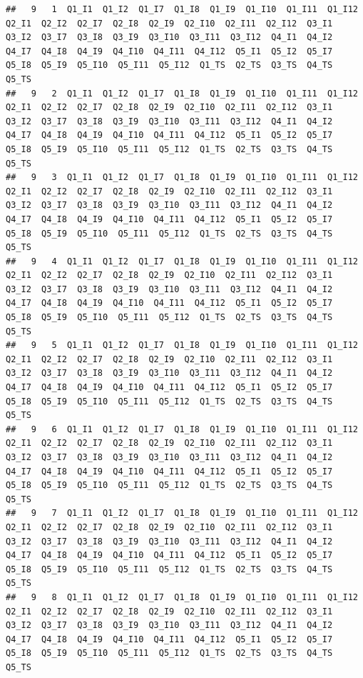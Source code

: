 \documentclass[]{book}
\begin{document}
\begin{verbatim}
##   9   1  Q1_I1  Q1_I2  Q1_I7  Q1_I8  Q1_I9  Q1_I10  Q1_I11  Q1_I12  Q2_I1  Q2_I2  Q2_I7  Q2_I8  Q2_I9  Q2_I10  Q2_I11  Q2_I12  Q3_I1  Q3_I2  Q3_I7  Q3_I8  Q3_I9  Q3_I10  Q3_I11  Q3_I12  Q4_I1  Q4_I2  Q4_I7  Q4_I8  Q4_I9  Q4_I10  Q4_I11  Q4_I12  Q5_I1  Q5_I2  Q5_I7  Q5_I8  Q5_I9  Q5_I10  Q5_I11  Q5_I12  Q1_TS  Q2_TS  Q3_TS  Q4_TS  Q5_TS
##   9   2  Q1_I1  Q1_I2  Q1_I7  Q1_I8  Q1_I9  Q1_I10  Q1_I11  Q1_I12  Q2_I1  Q2_I2  Q2_I7  Q2_I8  Q2_I9  Q2_I10  Q2_I11  Q2_I12  Q3_I1  Q3_I2  Q3_I7  Q3_I8  Q3_I9  Q3_I10  Q3_I11  Q3_I12  Q4_I1  Q4_I2  Q4_I7  Q4_I8  Q4_I9  Q4_I10  Q4_I11  Q4_I12  Q5_I1  Q5_I2  Q5_I7  Q5_I8  Q5_I9  Q5_I10  Q5_I11  Q5_I12  Q1_TS  Q2_TS  Q3_TS  Q4_TS  Q5_TS
##   9   3  Q1_I1  Q1_I2  Q1_I7  Q1_I8  Q1_I9  Q1_I10  Q1_I11  Q1_I12  Q2_I1  Q2_I2  Q2_I7  Q2_I8  Q2_I9  Q2_I10  Q2_I11  Q2_I12  Q3_I1  Q3_I2  Q3_I7  Q3_I8  Q3_I9  Q3_I10  Q3_I11  Q3_I12  Q4_I1  Q4_I2  Q4_I7  Q4_I8  Q4_I9  Q4_I10  Q4_I11  Q4_I12  Q5_I1  Q5_I2  Q5_I7  Q5_I8  Q5_I9  Q5_I10  Q5_I11  Q5_I12  Q1_TS  Q2_TS  Q3_TS  Q4_TS  Q5_TS
##   9   4  Q1_I1  Q1_I2  Q1_I7  Q1_I8  Q1_I9  Q1_I10  Q1_I11  Q1_I12  Q2_I1  Q2_I2  Q2_I7  Q2_I8  Q2_I9  Q2_I10  Q2_I11  Q2_I12  Q3_I1  Q3_I2  Q3_I7  Q3_I8  Q3_I9  Q3_I10  Q3_I11  Q3_I12  Q4_I1  Q4_I2  Q4_I7  Q4_I8  Q4_I9  Q4_I10  Q4_I11  Q4_I12  Q5_I1  Q5_I2  Q5_I7  Q5_I8  Q5_I9  Q5_I10  Q5_I11  Q5_I12  Q1_TS  Q2_TS  Q3_TS  Q4_TS  Q5_TS
##   9   5  Q1_I1  Q1_I2  Q1_I7  Q1_I8  Q1_I9  Q1_I10  Q1_I11  Q1_I12  Q2_I1  Q2_I2  Q2_I7  Q2_I8  Q2_I9  Q2_I10  Q2_I11  Q2_I12  Q3_I1  Q3_I2  Q3_I7  Q3_I8  Q3_I9  Q3_I10  Q3_I11  Q3_I12  Q4_I1  Q4_I2  Q4_I7  Q4_I8  Q4_I9  Q4_I10  Q4_I11  Q4_I12  Q5_I1  Q5_I2  Q5_I7  Q5_I8  Q5_I9  Q5_I10  Q5_I11  Q5_I12  Q1_TS  Q2_TS  Q3_TS  Q4_TS  Q5_TS
##   9   6  Q1_I1  Q1_I2  Q1_I7  Q1_I8  Q1_I9  Q1_I10  Q1_I11  Q1_I12  Q2_I1  Q2_I2  Q2_I7  Q2_I8  Q2_I9  Q2_I10  Q2_I11  Q2_I12  Q3_I1  Q3_I2  Q3_I7  Q3_I8  Q3_I9  Q3_I10  Q3_I11  Q3_I12  Q4_I1  Q4_I2  Q4_I7  Q4_I8  Q4_I9  Q4_I10  Q4_I11  Q4_I12  Q5_I1  Q5_I2  Q5_I7  Q5_I8  Q5_I9  Q5_I10  Q5_I11  Q5_I12  Q1_TS  Q2_TS  Q3_TS  Q4_TS  Q5_TS
##   9   7  Q1_I1  Q1_I2  Q1_I7  Q1_I8  Q1_I9  Q1_I10  Q1_I11  Q1_I12  Q2_I1  Q2_I2  Q2_I7  Q2_I8  Q2_I9  Q2_I10  Q2_I11  Q2_I12  Q3_I1  Q3_I2  Q3_I7  Q3_I8  Q3_I9  Q3_I10  Q3_I11  Q3_I12  Q4_I1  Q4_I2  Q4_I7  Q4_I8  Q4_I9  Q4_I10  Q4_I11  Q4_I12  Q5_I1  Q5_I2  Q5_I7  Q5_I8  Q5_I9  Q5_I10  Q5_I11  Q5_I12  Q1_TS  Q2_TS  Q3_TS  Q4_TS  Q5_TS
##   9   8  Q1_I1  Q1_I2  Q1_I7  Q1_I8  Q1_I9  Q1_I10  Q1_I11  Q1_I12  Q2_I1  Q2_I2  Q2_I7  Q2_I8  Q2_I9  Q2_I10  Q2_I11  Q2_I12  Q3_I1  Q3_I2  Q3_I7  Q3_I8  Q3_I9  Q3_I10  Q3_I11  Q3_I12  Q4_I1  Q4_I2  Q4_I7  Q4_I8  Q4_I9  Q4_I10  Q4_I11  Q4_I12  Q5_I1  Q5_I2  Q5_I7  Q5_I8  Q5_I9  Q5_I10  Q5_I11  Q5_I12  Q1_TS  Q2_TS  Q3_TS  Q4_TS  Q5_TS

\end{verbatim}
\end{document}
